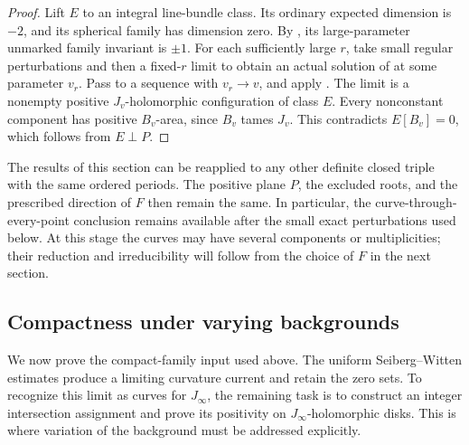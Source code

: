 \begin{proof}
Lift \(E\) to an integral line-bundle class.  Its ordinary expected
dimension is \(-2\), and its spherical family has dimension zero.
By , its large-parameter unmarked
family invariant is \(\pm1\).  For each sufficiently large
\(r\), take small regular perturbations and then a fixed-\(r\)
limit to obtain an actual solution of
 at some parameter \(v_r\).
Pass to a sequence with \(v_r\to v\), and apply
.  The limit is a nonempty
positive \(J_v\)-holomorphic configuration of class \(E\).
Every nonconstant component has positive \(B_v\)-area, since
\(B_v\) tames \(J_v\).  This contradicts
\(E[B_v]=0\), which follows from \(E\perp P\).
\end{proof}

\begin{remark}
 \label{rem:families-period-stability}
The results of this section can be reapplied to any other definite
closed triple with the same ordered periods.  The positive plane
\(P\), the excluded roots, and the prescribed direction of \(F\)
then remain the same.  In particular, the curve-through-every-point
conclusion remains available after the small exact perturbations
used below.  At this stage the curves may have several components
or multiplicities; their reduction and irreducibility will follow
from the choice of \(F\) in the next section.
\end{remark}

\subsection{Compactness under varying backgrounds}
\label{subsec:families-varying-compactness}

We now prove the compact-family input used above.  The uniform
Seiberg--Witten estimates produce a limiting curvature current and
retain the zero sets.  To recognize this limit as curves for
\(J_\infty\), the remaining task is to construct an integer
intersection assignment and prove its positivity on
\(J_\infty\)-holomorphic disks.  This is where variation of the
background must be addressed explicitly.

